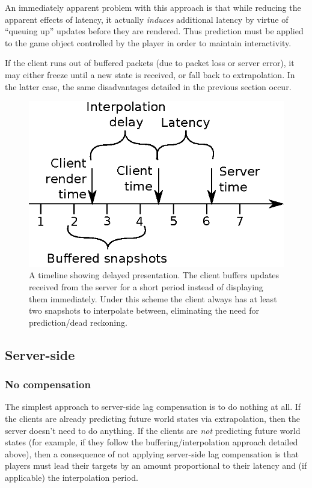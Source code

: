 \documentclass[conference]{IEEEtran}
\begin{document}
	An immediately apparent problem with this approach is that while reducing the apparent effects of latency, it actually \emph{induces} additional latency by virtue of ``queuing up'' updates before they are rendered. Thus prediction must be applied to the game object controlled by the player in order to maintain interactivity.

	If the client runs out of buffered packets (due to packet loss or server error), it may either freeze until a new state is received, or fall back to extrapolation. In the latter case, the same disadvantages detailed in the previous section occur.

	\begin{figure}
		\centering\includegraphics[width=\linewidth]{figures/interpolation_timeline.eps}
		\caption{A timeline showing delayed presentation. The client buffers updates received from the server for a short period instead of displaying them immediately. Under this scheme the client always has at least two snapshots to interpolate between, eliminating the need for prediction/dead reckoning.}
		\label{fig:interpolation_timeline}
	\end{figure}

	\subsection{Server-side}

	\subsubsection{No compensation}

	The simplest approach to server-side lag compensation is to do nothing at all. If the clients are already predicting future world states via extrapolation, then the server doesn't need to do anything. If the clients are \emph{not} predicting future world states (for example, if they follow the buffering/interpolation approach detailed above), then a consequence of not applying server-side lag compensation is that players must lead their targets by an amount proportional to their latency and (if applicable) the interpolation period.
\end{document}

